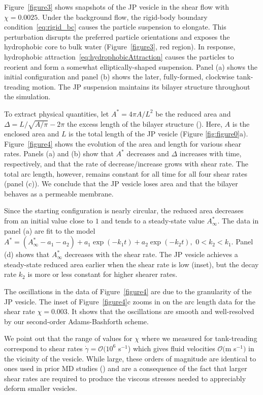 \documentclass[lineno]{jfm}
\begin{document}
Figure~\ref{figure3} shows snapshots of the JP vesicle in the shear flow
with $\chi=0.0025$. Under the background flow, the rigid-body boundary
condition~\eqref{eq:rigid_bc} causes the particle suspension to
elongate. This perturbation disrupts the preferred particle orientations
and exposes the hydrophobic core to bulk water (Figure~\ref{figure3},
red region). In response, hydrophobic
attraction~\eqref{eq:hydrophobicAttraction} causes the particles to
reorient and form a somewhat elliptically-shaped suspension. Panel (a)
shows the initial configuration and panel (b) shows the later,
fully-formed, clockwise tank-treading motion. The JP suspension
maintains its bilayer structure throughout the simulation. 
%

To extract physical quantities, let $A^* = 4\pi A/L^2$ be the reduced
area and $\Delta=L/\sqrt{A/\pi} - 2\pi$ the excess length of the bilayer
structure (\cite{Finken08}). Here, $A$ is the enclosed area and $L$ is
the total length of the JP vesicle (Figure \ref{fig:figure0}a).
Figure~\ref{figure4} shows the evolution of the area and length for
various shear rates. Panels (a) and (b) show that $A^*$ decreases and
$\Delta$ increases with time, respectively, and that the rate of
decrease/increase grows with shear rate. The total arc length, however,
remains constant for all time for all four shear rates (panel (c)). We
conclude that the JP vesicle loses area and that the bilayer behaves as
a permeable membrane. 

Since the starting configuration is nearly circular, the reduced area
decreases from an initial value close to $1$ and tends to a steady-state
value $A^*_{\infty}$. The data in panel (a) are fit to the model $A^* =
(A^*_{\infty}-a_1-a_2) + a_1 \exp(-k_1t) + a_2 \exp(-k_2t),$ $0 < k_2 <
k_1$. Panel (d) shows that $A^*_{\infty}$ decreases with the shear rate.
The JP vesicle achieves a steady-state reduced area earlier when the
shear rate is low (inset), but the decay rate $k_2$ is more or less
constant for higher shearer rates. 

The oscillations in the data of Figure~\ref{figure4} are due to the
granularity of the JP vesicle. The inset of Figure~\ref{figure4}c zooms
in on the arc length data for the shear rate $\chi = 0.003$. It shows
that the oscillations are smooth and well-resolved by our second-order
Adams-Bashforth scheme.

We point out that the range of values for $\chi$ where we measured for
tank-treading correspond to shear rates $\dot \gamma = \mathcal{O}(10^6$
s$^{-1}$) which gives fluid velocities $\mathcal{O}($m s$^{-1}$$)$ in
the vicinity of the vesicle. While large, these orders of magnitude are identical to
ones used in prior MD studies (\cite{Brandner2019}) and are a
consequence of the fact that larger shear rates are required to produce
the viscous stresses needed to appreciably deform smaller vesicles. 
\end{document}
